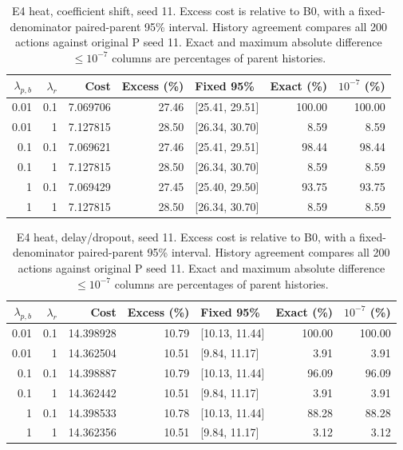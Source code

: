 \begin{table}[ht]
\centering\small
\caption{E4 heat, coefficient shift, seed 11. Excess cost is relative to B0, with a fixed-denominator paired-parent 95\% interval. History agreement compares all 200 actions against original P seed 11. Exact and maximum absolute difference $\leq10^{-7}$ columns are percentages of parent histories.}\label{tab:weights_control_heat_locked_coefficient_ood}
\begin{tabular}{@{}rrrrlrr@{}}\toprule
$\lambda_{p,b}$ & $\lambda_r$ & Cost & Excess (\%) & Fixed 95\% & Exact (\%) & $10^{-7}$ (\%)\\\midrule
0.01 & 0.1 & 7.069706 & 27.46 & [25.41, 29.51] & 100.00 & 100.00\\
0.01 & 1 & 7.127815 & 28.50 & [26.34, 30.70] & 8.59 & 8.59\\
0.1 & 0.1 & 7.069621 & 27.46 & [25.41, 29.51] & 98.44 & 98.44\\
0.1 & 1 & 7.127815 & 28.50 & [26.34, 30.70] & 8.59 & 8.59\\
1 & 0.1 & 7.069429 & 27.45 & [25.40, 29.50] & 93.75 & 93.75\\
1 & 1 & 7.127815 & 28.50 & [26.34, 30.70] & 8.59 & 8.59\\
\bottomrule\end{tabular}
\end{table}

\begin{table}[ht]
\centering\small
\caption{E4 heat, delay/dropout, seed 11. Excess cost is relative to B0, with a fixed-denominator paired-parent 95\% interval. History agreement compares all 200 actions against original P seed 11. Exact and maximum absolute difference $\leq10^{-7}$ columns are percentages of parent histories.}\label{tab:weights_control_heat_locked_delay_dropout}
\begin{tabular}{@{}rrrrlrr@{}}\toprule
$\lambda_{p,b}$ & $\lambda_r$ & Cost & Excess (\%) & Fixed 95\% & Exact (\%) & $10^{-7}$ (\%)\\\midrule
0.01 & 0.1 & 14.398928 & 10.79 & [10.13, 11.44] & 100.00 & 100.00\\
0.01 & 1 & 14.362504 & 10.51 & [9.84, 11.17] & 3.91 & 3.91\\
0.1 & 0.1 & 14.398887 & 10.79 & [10.13, 11.44] & 96.09 & 96.09\\
0.1 & 1 & 14.362442 & 10.51 & [9.84, 11.17] & 3.91 & 3.91\\
1 & 0.1 & 14.398533 & 10.78 & [10.13, 11.44] & 88.28 & 88.28\\
1 & 1 & 14.362356 & 10.51 & [9.84, 11.17] & 3.12 & 3.12\\
\bottomrule\end{tabular}
\end{table}
